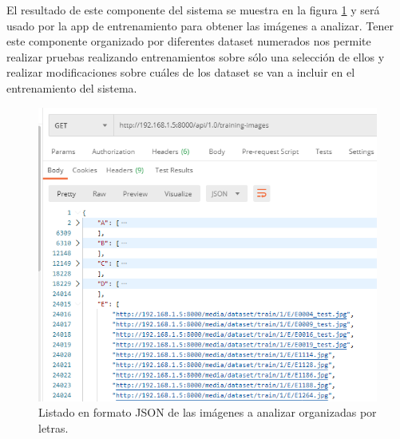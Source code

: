 \documentclass[../main.tex]{subfiles}
\begin{document}
\newpage

El resultado de este componente del sistema se muestra en la figura  \ref{figure4} y será usado por la app de entrenamiento para obtener las imágenes a analizar. Tener este componente organizado por diferentes dataset numerados nos permite realizar pruebas realizando entrenamientos sobre sólo una selección de ellos y realizar modificaciones sobre cuáles de los dataset se van a incluir en el entrenamiento del sistema.
\begin{figure}[h]
\centering 
\includegraphics[width=1\textwidth]{images/apirest/api6.PNG}
\caption{Listado en formato JSON de las imágenes a analizar organizadas por letras.}
\label{figure4}
\end{figure}
\end{document}
